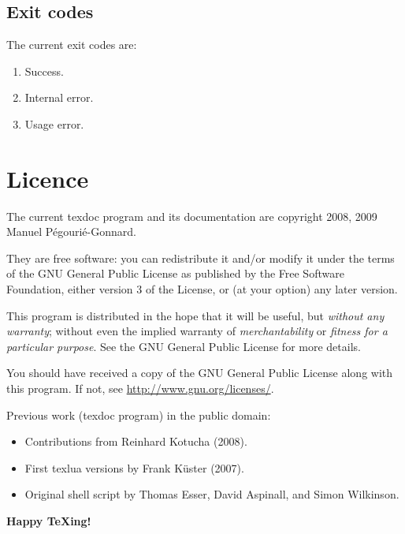 \documentclass[a4paper, oneside]{scrartcl}
\newcommand\tex{\TeX\xspace}
\begin{document}
\subsection{Exit codes}\label{ss-exit}

The current exit codes are:
\begin{enumerate}[start=0]
  \item Success.
  \item Internal error.
  \item Usage error.
\end{enumerate}

\section{Licence}\label{s-licence}

The current texdoc program and its documentation are copyright 2008, 2009
Manuel Pégourié-Gonnard.

They are free software: you can redistribute it and/or modify it under the
terms of the GNU General Public License as published by the Free Software
Foundation, either version 3 of the License, or (at your option) any later
version.

This program is distributed in the hope that it will be useful, but
\emph{without any warranty}; without even the implied warranty of
\emph{merchantability} or \emph{fitness for a particular purpose}.  See the
GNU General Public License for more details.

You should have received a copy of the GNU General Public License along with
this program.  If not, see \url{http://www.gnu.org/licenses/}.

\bigskip

Previous work (texdoc program) in the public domain:
\begin{itemize}
  \item Contributions from Reinhard Kotucha (2008).
  \item First texlua versions by Frank Küster (2007).
  \item Original shell script by Thomas Esser, David Aspinall, and Simon
	Wilkinson.
\end{itemize}

\bigskip
\begin{center}\Large\rmfamily\bfseries
  Happy \tex{}ing!
\end{center}
\end{document}
